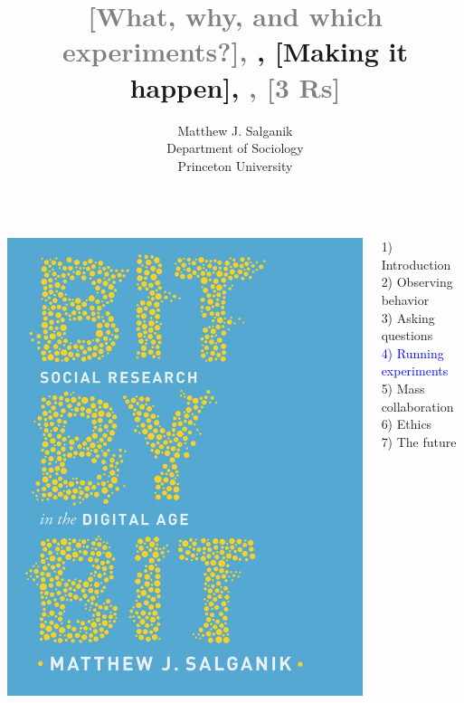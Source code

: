 \documentclass[aspectratio=169]{beamer}
\title[]{\textcolor{gray}{[What, why, and which experiments?], \newline [Moving beyond simple experiments]}, [Making it happen], \textcolor{gray}{\newline [Zero variable cost data and MusicLab], [3 Rs]}}
\author[]{Matthew J. Salganik\\Department of Sociology\\Princeton University}
\date[]{
\begin{flushright}
\texttt{[image: figures/cc-by.png]}
\end{flushright}
}
\begin{document}
\frame{\titlepage}
\begin{frame}

\begin{columns}
\begin{column}{.40\textwidth}
\includegraphics[width=\textwidth]{figures/salganik_bit_2018_cover}
\end{column}%

\hfill%

\begin{column}{.60\textwidth}
1) Introduction \\
2) Observing behavior \\
3) Asking questions \\
\textcolor{blue}{4) Running experiments} \\
5) Mass collaboration \\
6) Ethics \\
7) The future \\
\end{column}%
\end{columns}

\end{frame}
\end{document}
